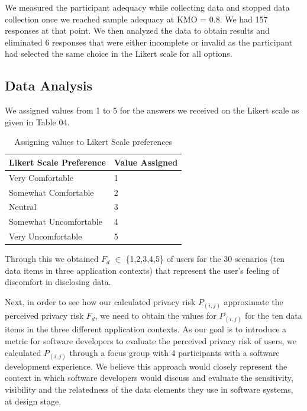 \documentclass[conference]{IEEEtran}
\begin{document}
We measured the participant adequacy while collecting data and stopped data collection once we reached sample adequacy at KMO = 0.8. We had 157 responses at that point. We then analyzed the data to obtain results and eliminated 6 responses that were either incomplete or invalid as the participant had selected the same choice in the Likert scale for all options.

\subsection {Data Analysis}

We assigned values from 1 to 5 for the answers we received on the Likert scale as given in Table 04.

\begin{center}
\begin{table}[htbp]
\caption{Assigning values to Likert Scale preferences}
\begin{center}
\begin{tabular}{|l|l|} 
\hline
Likert Scale Preference & Value Assigned \\
\hline
Very Comfortable & 1\\
\hline
Somewhat Comfortable& 2 \\
\hline
Neutral & 3  \\
\hline
Somewhat Uncomfortable & 4 \\
\hline
Very Uncomfortable & 5 \\
\hline
\end{tabular}
\end{center}
\end{table}
\end{center}

Through this we obtained $F_d$ $\in$ \{1,2,3,4,5\} of users for the 30 scenarios (ten data items in three application contexts) that represent the user's feeling of discomfort in disclosing data.

Next, in order to see how our calculated privacy risk $P_{(i,j)}$ approximate the perceived privacy risk $F_d$, we need to obtain the values for $P_{(i,j)}$ for the ten data items in the three different application contexts. As our goal is to introduce a metric for software developers to evaluate the perceived privacy risk of users, we calculated $P_{(i,j)}$ through a focus group with 4 participants with a software development experience. We believe this approach would closely represent the context in which software developers would discuss and evaluate the sensitivity, visibility and the relatedness of the data elements they use in software systems, at design stage. 
\end{document}
